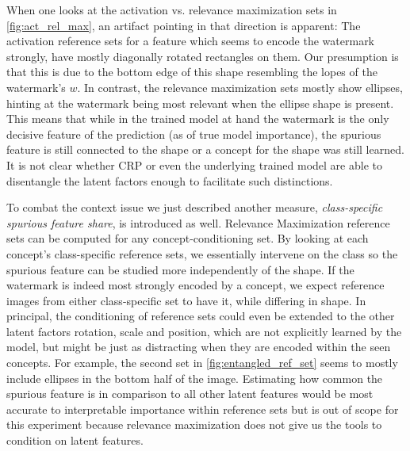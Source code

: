 When one looks at the activation vs. relevance maximization sets in \cref{fig:act_rel_max}, an artifact pointing in that direction is apparent: 
The activation reference sets for a feature which seems to encode the watermark strongly, have mostly diagonally rotated rectangles on them. Our presumption is that this is due to the bottom edge of this shape resembling the lopes of the watermark's $w$. 
In contrast, the relevance maximization sets mostly show ellipses, hinting at the watermark being most relevant when the ellipse shape is present. 
This means that while in the trained model at hand the watermark is the only decisive feature of the prediction (as of true model importance), the spurious feature is still connected to the shape or a concept for the shape was still learned. 
It is not clear whether CRP or even the underlying trained model are able to disentangle the latent factors enough to facilitate such distinctions.

To combat the context issue we just described another measure, \textit{class-specific spurious feature share}, is introduced as well. 
Relevance Maximization reference sets can be computed for any concept-conditioning set. 
By looking at each concept's class-specific reference sets, we essentially intervene on the class so the spurious feature can be studied more independently of the shape. If the watermark is indeed most strongly encoded by a concept, we expect reference images from either class-specific set to have it, while differing in shape.
In principal, the conditioning of reference sets could even be extended to the other latent factors rotation, scale and position, which are not explicitly learned by the model, but might be just as distracting when they are encoded within the seen concepts. For example, the second set in \cref{fig:entangled_ref_set} seems to mostly include ellipses in the bottom half of the image. Estimating how common the spurious feature is in comparison to all other latent features would be most accurate to interpretable importance within reference sets but is out of scope for this experiment because relevance maximization does not give us the tools to condition on latent features.

